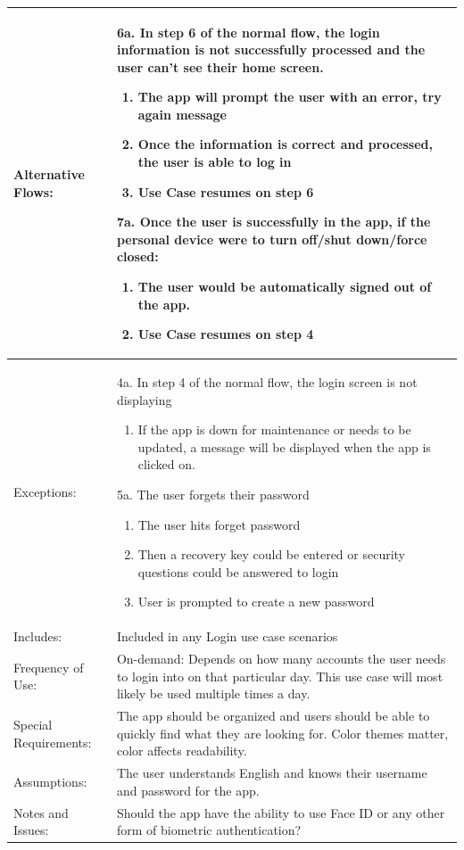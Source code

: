\documentclass[stu]{apa7}
\newcommand{\nextitem}{\par\hspace*{\labelsep}\textbullet\hspace*{\labelsep}}
\newcommand{\nextitemblank}{\par\hspace*{\labelsep}\hspace*{\labelsep}}
\begin{document}
{\begin{xltabular}{\textwidth}{|l|X|}
  Alternative Flows: & \nextitemblank 6a. In step 6 of the normal flow, the login information is not successfully processed and the user can’t see their home screen.
   \begin{enumerate}
      \item The app will prompt the user with an error, try again message 
      \item Once the information is correct and processed, the user is able to log in
      \item Use Case resumes on step 6
    \end{enumerate}
    \nextitemblank 7a. Once the user is successfully in the app, if the personal device were to turn off/shut down/force closed:
    \begin{enumerate}
      \item The user would be automatically signed out of the app.
      \item Use Case resumes on step 4 
   \end{enumerate} \\ \hline
  
  Exceptions: & \nextitemblank 4a. In step 4 of the normal flow, the login screen is not displaying 
    \begin{enumerate}
      \item If the app is down for maintenance or needs to be updated, a message will be displayed when the app is clicked on.
    \end{enumerate} 
  \nextitemblank 5a. The user forgets their password 
    \begin{enumerate}
      \item The user hits forget password
      \item Then a recovery key could be entered or security questions could be answered to login
      \item User is prompted to create a new password 
    \end{enumerate} \\ \hline

  Includes: &  Included in any Login use case scenarios \\ \hline

  Frequency of Use: & On-demand: Depends on how many accounts the user needs to login into on that particular day. This use case will most likely be used multiple times a day. \\ \hline

  Special Requirements: & The app should be organized and users should be able to quickly find what they are looking for. Color themes matter, color affects readability. \\ \hline

  Assumptions: & \nextitem The user understands English and knows their username and password for the app. \\ \hline

  Notes and Issues: & \nextitem Should the app have the ability to use Face ID or any other form of biometric authentication? \\ \hline

\end{xltabular}}
\end{document}
